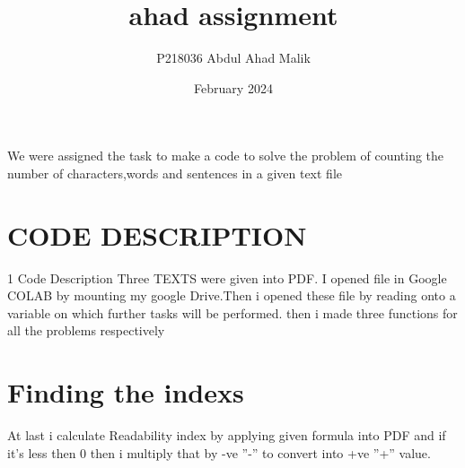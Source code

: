 \documentclass{article}
\title{ahad assignment}
\author{P218036 Abdul Ahad Malik}
\date{February 2024}
\begin{document}
\maketitle


We were assigned the task to make a code to solve the problem of counting the number of characters,words and sentences in a given text file
\section{CODE DESCRIPTION}
1 Code Description
Three TEXTS were given into PDF. I opened file in Google COLAB by mounting
my google Drive.Then i opened these file by reading onto a variable on which further tasks will be performed. then i made three functions for all the problems respectively
\section{Finding the indexs}
At last i calculate Readability index by applying given formula into PDF and if it’s less then 0 then i multiply that by -ve ”-” to convert into +ve ”+” value.
\end{document}
